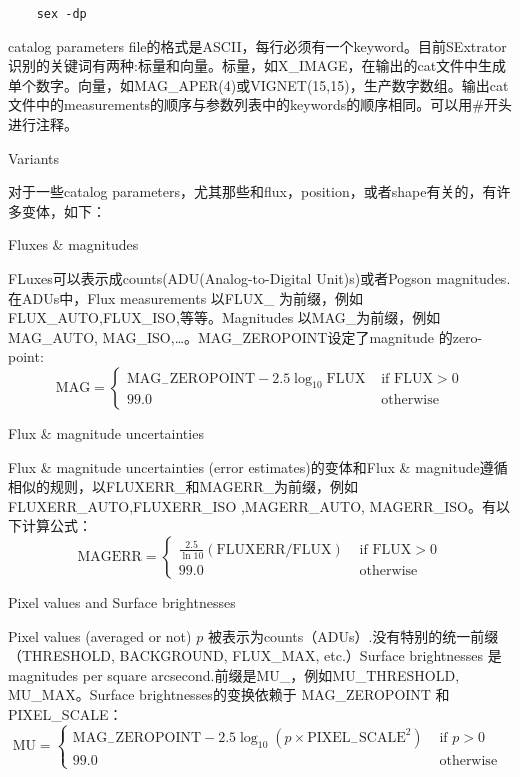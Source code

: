 \documentclass[CJK, utf8, GBK, oneside, a4paper, 12pt]{ctexart}
\begin{document}
\begin{lstlisting}
    sex -dp 
\end{lstlisting}

catalog parameters file的格式是ASCII，每行必须有一个keyword。目前SExtrator识别的关键词有两种:标量和向量。标量，如X\_IMAGE，在输出的cat文件中生成单个数字。向量，如MAG\_APER(4)或VIGNET(15,15)，生产数字数组。输出cat文件中的measurements的顺序与参数列表中的keywords的顺序相同。可以用\#开头进行注释。

Variants

对于一些catalog parameters，尤其那些和flux，position，或者shape有关的，有许多变体，如下：

Fluxes \& magnitudes

FLuxes可以表示成counts(ADU(Analog-to-Digital Unit)s)或者Pogson magnitudes.在ADUs中，Flux measurements 以FLUX\_ 为前缀，例如FLUX\_AUTO,FLUX\_ISO,等等。Magnitudes 以MAG\_为前缀，例如MAG\_AUTO, MAG\_ISO,\dots。MAG\_ZEROPOINT设定了magnitude 的zero-point:
\begin{equation*}\mathrm{MAG}=\left\{\begin{array}{ll}
    \mathrm{MAG}_{-} \mathrm{ZEROPOINT}-2.5 \log _{10} \mathrm{FLUX} & \text { if } \mathrm{FLUX}>0 \\
    99.0 & \text { otherwise }
    \end{array}\right.\end{equation*}

Flux \& magnitude uncertainties

Flux \& magnitude uncertainties (error estimates)的变体和Flux \& magnitude遵循相似的规则，以FLUXERR\_和MAGERR\_为前缀，例如FLUXERR\_AUTO,FLUXERR\_ISO ,MAGERR\_AUTO, MAGERR\_ISO。有以下计算公式：
\begin{equation*}\mathrm{MAGERR}=\left\{\begin{array}{ll}
    \frac{2.5}{\ln 10}(\mathrm{FLUXERR} / \mathrm{FLUX}) & \text { if } \mathrm{FLUX}>0 \\
    99.0 & \text { otherwise }
    \end{array}\right.\end{equation*}

Pixel values and Surface brightnesses

Pixel values (averaged or not) $p$ 被表示为counts（ADUs）.没有特别的统一前缀（THRESHOLD,
BACKGROUND, FLUX\_MAX, etc.）Surface brightnesses 是magnitudes per square arcsecond.前缀是MU\_，例如MU\_THRESHOLD, MU\_MAX。Surface brightnesses的变换依赖于 MAG\_ZEROPOINT 和 PIXEL\_SCALE：
\begin{equation*}\mathrm{MU}=\left\{\begin{array}{ll}
    \mathrm{MAG}_{-} \mathrm{ZEROPOINT}-2.5 \log _{10}\left(p \times \mathrm{PIXEL}_{-} \mathrm{SCALE}^{2}\right) & \text { if } p>0 \\
    99.0 & \text { otherwise }
    \end{array}\right.\end{equation*}
\end{document}
